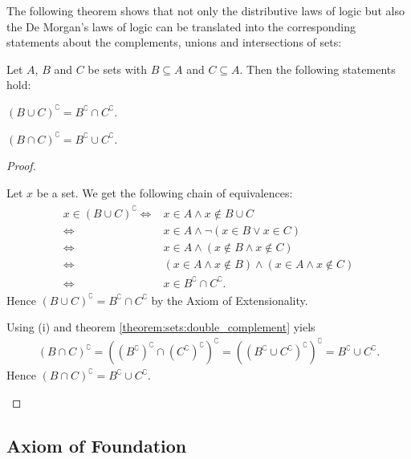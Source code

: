 The following theorem shows that not only the distributive laws of logic but also the De Morgan's laws of logic can be translated into the corresponding statements about the complements, unions and intersections of sets:

\begin{theorem}
    Let $A$, $B$ and $C$ be sets with $B\subseteq A$ and $C\subseteq A$. Then the following statements hold:
    \begin{intheoremenumerate}
        \item $(B\cup C)^\complement=B^\complement\cap C^\complement$.
        \item\label{theorem:sets:de_morgan_laws_cap} $(B\cap C)^\complement=B^\complement\cup C^\complement$.
    \end{intheoremenumerate}
\end{theorem}

\begin{proof}
    \begin{proofenumerate}
        \item Let $x$ be a set. We get the following chain of equivalences:
        \begin{align}\begin{split}x\in(B\cup C)^\complement\iff& x\in A\land x\notin B\cup C\\
        \iff& x\in A\land\lnot(x\in B\lor x\in C)\\
        \iff& x\in A\land (x\notin B\land x\notin C)\\
        \iff& (x\in A\land x\notin B)\land (x\in A\land x\notin C)\\
        \iff& x\in B^\complement\cap C^\complement.\end{split}\end{align}
        Hence $(B\cup C)^\complement=B^\complement\cap C^\complement$ by the Axiom of Extensionality.
        \item Using (i) and theorem \ref{theorem:sets:double_complement} yiels \begin{align}(B\cap C)^\complement=((B^\complement)^\complement\cap (C^\complement)^\complement)^\complement=((B^\complement\cup C^\complement)^\complement)^\complement=B^\complement\cup C^\complement.\end{align}
        Hence $(B\cap C)^\complement=B^\complement\cup C^\complement$.
    \end{proofenumerate}
\end{proof}

\subsection{Axiom of Foundation}

